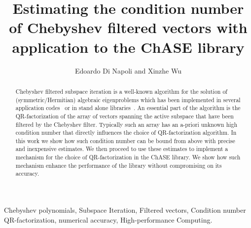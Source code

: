 \documentclass{siamart250211}
\title{Estimating the condition number of Chebyshev filtered vectors with application to the ChASE library%
    }
\author{Edoardo Di Napoli and Xinzhe Wu\footnotemark[3]}%
\begin{document}
\maketitle

\renewcommand{\thefootnote}{\fnsymbol{footnote}}



\renewcommand{\thefootnote}{\arabic{footnote}}

\begin{abstract} %
  Chebyshev filtered subspace iteration is a well-known algorithm for the solution of (symmetric/Hermitian) algebraic eigenproblems which has been implemented in several application codes~\cite{Kronik:2006ff, abinit:2020} or in stand alone libraries~\cite{ChASE}. An essential part of the algorithm is the QR-factorization of the array of vectors spanning the active subspace that have been filtered by the Chebyshev filter. Typically such an array has an a-priori unknown high condition number that directly influences the choice of QR-factorization algorithm. In this work we show how such condition number can be bound from above with precise and inexpensive estimates. We then proceed to use these estimates to implement a mechanism for the choice of QR-factorization in the ChASE library. We show how such mechanism enhance the performance of the library without compromising on its accuracy.     
\end{abstract}

\begin{keywords}
  Chebyshev polynomials, Subspace Iteration, Filtered vectors, Condition number
  QR-factorization, numerical accuracy, High-performance Computing.
\end{keywords}


\pagestyle{myheadings}
\thispagestyle{plain}
\end{document}
